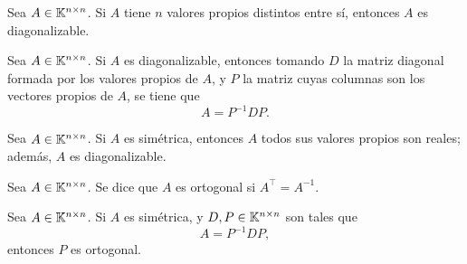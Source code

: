 \documentclass[a4,11pt]{aleph-notas}
\begin{document}
\begin{teo}
    Sea $A\in \Mat[\K]{n}{n}$. Si $A$ tiene $n$ valores propios distintos entre sí, entonces $A$ es diagonalizable.
\end{teo}

\begin{teo}
    Sea $A\in \Mat[\K]{n}{n}$. Si $A$ es diagonalizable, entonces tomando $D$ la matriz diagonal formada por los valores propios de $A$, y $P$ la matriz cuyas columnas son los vectores propios de $A$, se tiene que
    \[
        A = P^{-1} D P.
    \]
\end{teo}

\begin{teo}
    Sea $A\in \Mat[\K]{n}{n}$. Si $A$ es simétrica, entonces $A$ todos sus valores propios son reales; además, $A$ es diagonalizable.
\end{teo}

\begin{defi}
    Sea $A\in \Mat[\K]{n}{n}$. Se dice que $A$ es ortogonal si $A^\intercal = A^{-1}$.
\end{defi}


\begin{teo}
    Sea $A\in \Mat[\K]{n}{n}$. Si $A$ es simétrica, y $D,P\in \Mat[\K]{n}{n}$ son tales que
    \[
        A = P^{-1} D P,
    \]
    entonces $P$ es ortogonal.
\end{teo}
\end{document}
